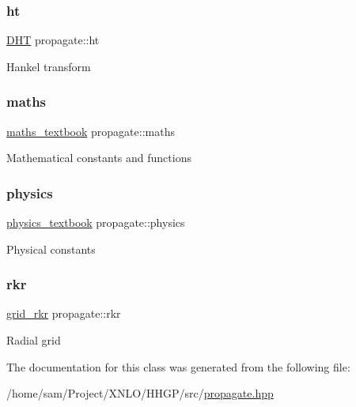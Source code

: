 \subsubsection{\texorpdfstring{ht}{ht}}
{\footnotesize\ttfamily \hyperlink{class_d_h_t}{D\+HT} propagate\+::ht\hspace{0.3cm}{\ttfamily [private]}}

Hankel transform \mbox{\label{classpropagate_a31485a3e1e9d0e346228910034095766}} 
\subsubsection{\texorpdfstring{maths}{maths}}
{\footnotesize\ttfamily \hyperlink{classmaths__textbook}{maths\+\_\+textbook} propagate\+::maths\hspace{0.3cm}{\ttfamily [private]}}

Mathematical constants and functions \mbox{\label{classpropagate_a5f5fdad229714c1ad7f7324e0c51efcb}} 
\subsubsection{\texorpdfstring{physics}{physics}}
{\footnotesize\ttfamily \hyperlink{classphysics__textbook}{physics\+\_\+textbook} propagate\+::physics\hspace{0.3cm}{\ttfamily [private]}}

Physical constants \mbox{\label{classpropagate_ad28456de6e333e20b03dc8bc48b6296d}} 
\subsubsection{\texorpdfstring{rkr}{rkr}}
{\footnotesize\ttfamily \hyperlink{classgrid__rkr}{grid\+\_\+rkr} propagate\+::rkr\hspace{0.3cm}{\ttfamily [private]}}

Radial grid 

The documentation for this class was generated from the following file\+:\begin{DoxyCompactItemize}
\item 
/home/sam/\+Project/\+X\+N\+L\+O/\+H\+H\+G\+P/src/\hyperlink{propagate_8hpp}{propagate.\+hpp}\end{DoxyCompactItemize}
